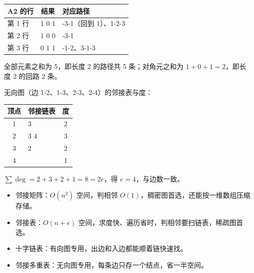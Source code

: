 \documentclass[10pt,a4paper]{ctexart}
\begin{document}
\begin{center}\small
\begin{tabularx}{\linewidth}{@{}lc>{\raggedright\arraybackslash}X@{}}
\toprule
A2 的行 & 结果 & 对应路径 \\
\midrule
第 1 行 & 1 0 1 & 1-3-1（回到 1）、1-2-3 \\
第 2 行 & 1 0 0 & 2-3-1 \\
第 3 行 & 0 1 1 & 3-1-2、3-1-3 \\
\bottomrule
\end{tabularx}
\end{center}

全部元素之和为 5，即长度 2 的路径共 5 条；对角元之和为 $1+0+1=2$，即长度 2 的回路 2 条。

无向图（边 1-2、1-3、2-3、2-4）的邻接表与度：

\begin{center}\small
\begin{tabularx}{\linewidth}{@{}c>{\raggedright\arraybackslash}Xc@{}}
\toprule
顶点 & 邻接链表 & 度 \\
\midrule
1 & 2 3 & 2 \\
2 & 1 3 4 & 3 \\
3 & 1 2 & 2 \\
4 & 2 & 1 \\
\bottomrule
\end{tabularx}
\end{center}

$\sum \deg=2+3+2+1=8=2e$，得 $e=4$，与边数一致。


\begin{itemize}

\item 邻接矩阵：$O(n^2)$ 空间，判相邻 $O(1)$，稠密图首选，还能按一维数组压缩存储。

\item 邻接表：$O(n+e)$ 空间，求度快、遍历省时，判相邻要扫链表，稀疏图首选。

\item 十字链表：有向图专用，出边和入边都能顺着链快速找。

\item 邻接多重表：无向图专用，每条边只存一个结点，省一半空间。

\end{itemize}


\end{document}
